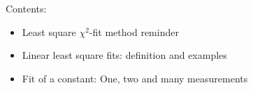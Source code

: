 %
%
%

\begin{slide}
\pagestyle{headings}
\sf 
{}
%
\Large
Contents:
\begin{itemize}
\item
Least square $\chi^2$-fit method reminder
\item 
Linear least square fits: definition and examples
\item
Fit of a constant: One, two and many measurements
%
\end{itemize}
%
\end{slide}



